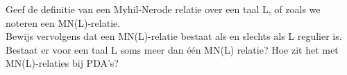 \begin{question}
Geef de definitie van een Myhil-Nerode relatie over een taal L, of zoals we noteren een MN(L)-relatie. \\
Bewijs vervolgens dat een MN(L)-relatie bestaat als en slechts als L regulier is. Bestaat er voor een taal L soms meer dan één MN(L) relatie? Hoe zit het met MN(L)-relaties bij PDA’s?
\end{question}
